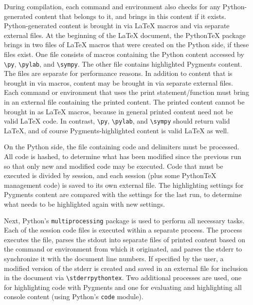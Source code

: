 \documentclass[letterpaper,compsoc,twoside]{IEEEtran}
\begin{document}
During compilation, each command and environment also checks for any Python-generated content that belongs to it, and brings in this content
if it exists.  Python-generated content is brought in via LaTeX macros
and via separate external files.  At the beginning of the LaTeX document,
the PythonTeX package brings in two files of LaTeX macros that were
created on the Python side, if these files exist.  One file consists
of macros containing the Python content accessed by \texttt{\textbackslash{}py}, \texttt{\textbackslash{}pylab},
and \texttt{\textbackslash{}sympy}.  The other file contains highlighted Pygments content.
The files are separate for performance reasons.  In addition to content
that is brought in via macros, content may be brought in via separate
external files.  Each command or environment that uses the print
statement/function must bring in an external file containing the
printed content.  The printed content cannot be brought in as LaTeX
macros, because in general printed content need not be valid LaTeX
code.  In contrast, \texttt{\textbackslash{}py}, \texttt{\textbackslash{}pylab}, and \texttt{\textbackslash{}sympy} should return valid
LaTeX, and of course Pygments-highlighted content is valid LaTeX
as well.

On the Python side, the file containing code and delimiters must be
processed.  All code is hashed, to determine what has been modified
since the previous run so that only new and modified code may be
executed.  Code that must be executed is divided by session, and each
session (plus some PythonTeX management code) is saved to its own
external file.  The highlighting settings for Pygments content are
compared with the settings for the last run, to determine what needs
to be highlighted again with new settings.

Next, Python's \texttt{multiprocessing} package is used to perform all
necessary tasks.  Each of the session code files is executed within
a separate process.  The process executes the file, parses the stdout
into separate files of printed content based on the command or
environment from which it originated, and parses the stderr to
synchronize it with the document line numbers.  If specified by the
user, a modified version of the stderr is created and saved in an
external file for inclusion in the document via \texttt{\textbackslash{}stderrpythontex}.
Two additional processes are used, one for highlighting code with
Pygments and one for evaluating and highlighting all console content
(using Python's \texttt{code} module).
\end{document}
